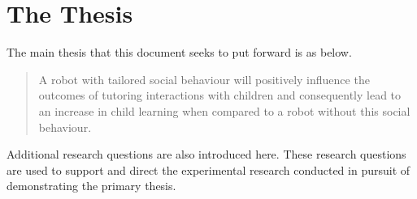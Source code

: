 \section{The Thesis}\label{sec:intro-thesis}
The main thesis that this document seeks to put forward is as below.

\begin{quote}
A robot with \gls{tailored} social behaviour will positively influence the outcomes of tutoring interactions with children and consequently lead to an increase in child \gls{learning} when compared to a robot without this social behaviour.
\end{quote}

Additional research questions are also introduced here. These research questions are used to support and direct the experimental research conducted in pursuit of demonstrating the primary thesis.


